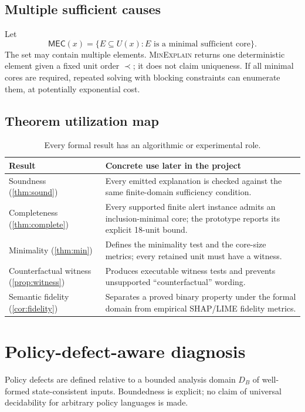 \documentclass[11pt]{article}
\theoremstyle{remark}
\begin{document}
\subsection{Multiple sufficient causes}
Let
\[
\mathsf{MEC}(x)=\{E\subseteq U(x): E\text{ is a minimal sufficient core}\}.
\]
The set may contain multiple elements. \textsc{MinExplain} returns one deterministic element given a fixed unit order $\prec$; it does not claim uniqueness. If all minimal cores are required, repeated solving with blocking constraints can enumerate them, at potentially exponential cost.

\subsection{Theorem utilization map}
\begin{table}[h]
\centering
\begin{tabularx}{\textwidth}{p{3.4cm}X}
\toprule
Result & Concrete use later in the project \\
\midrule
Soundness (\cref{thm:sound}) & Every emitted explanation is checked against the same finite-domain sufficiency condition.\\
Completeness (\cref{thm:complete}) & Every supported finite alert instance admits an inclusion-minimal core; the prototype reports its explicit 18-unit bound.\\
Minimality (\cref{thm:min}) & Defines the minimality test and the core-size metrics; every retained unit must have a witness.\\
Counterfactual witness (\cref{prop:witness}) & Produces executable witness tests and prevents unsupported ``counterfactual'' wording.\\
Semantic fidelity (\cref{cor:fidelity}) & Separates a proved binary property under the formal domain from empirical SHAP/LIME fidelity metrics.\\
\bottomrule
\end{tabularx}
\caption{Every formal result has an algorithmic or experimental role.}\label{tab:theorem-use}
\end{table}

\section{Policy-defect-aware diagnosis}

Policy defects are defined relative to a bounded analysis domain $D_B$ of well-formed state-consistent inputs. Boundedness is explicit; no claim of universal decidability for arbitrary policy languages is made.
\end{document}
